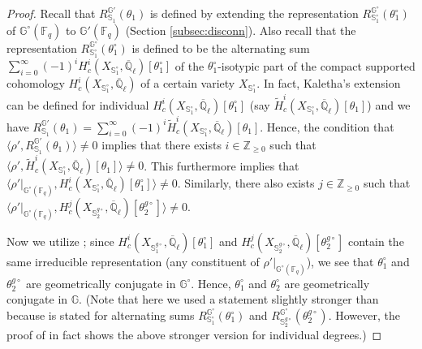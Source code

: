 \documentclass{amsart}
\newcommand{\Z}{\mathbb{Z}}
\newcommand{\F}{\mathbb{F}}
\newcommand{\Q}{\mathbb{Q}}
\newcommand{\bbS}{\mathbb{S}}
\newcommand{\bbG}{\mathbb{G}}
\theoremstyle{plain}
\theoremstyle{definition}
\theoremstyle{remark}
\theoremstyle{theorem}
\begin{document}
\begin{proof}
Recall that $R_{\bbS_{1}}^{\bbG'}(\theta_{1})$ is defined by extending the representation $R_{\bbS_{1}^{\circ}}^{\bbG^{\circ}}(\theta_{1}^{\circ})$ of $\bbG^{\circ}(\F_{q})$ to $\bbG'(\F_{q})$ (Section \ref{subsec:disconn}).
Also recall that the representation $R_{\bbS_{1}^{\circ}}^{\bbG^{\circ}}(\theta_{1}^{\circ})$ is defined to be the alternating sum $\sum_{i=0}^{\infty}(-1)^{i}H_{c}^{i}(X_{\bbS_{1}^{\circ}},\overline{\Q}_{\ell})[\theta_{1}^{\circ}]$ of the $\theta_{1}^{\circ}$-isotypic part of the compact supported cohomology $H_{c}^{i}(X_{\bbS_{1}^{\circ}},\overline{\Q}_{\ell})$ of a certain variety $X_{\bbS_{1}^{\circ}}$.
In fact, Kaletha's extension can be defined for individual $H_{c}^{i}(X_{\bbS_{1}^{\circ}},\overline{\Q}_{\ell})[\theta_{1}^{\circ}]$ (say $\tilde{H}_{c}^{i}(X_{\bbS_{1}^{\circ}},\overline{\Q}_{\ell})[\theta_{1}]$) and we have $R_{\bbS_{1}}^{\bbG'}(\theta_{1})=\sum_{i=0}^{\infty}(-1)^{i}\tilde{H}_{c}^{i}(X_{\bbS_{1}^{\circ}},\overline{\Q}_{\ell})[\theta_{1}]$.
Hence, the condition that $\langle \rho', R_{\bbS_{1}}^{\bbG'}(\theta_{1}) \rangle \neq 0$ implies that there exists $i\in\Z_{\geq0}$ such that
$\langle \rho', \tilde{H}_{c}^{i}(X_{\bbS_{1}^{\circ}},\overline{\Q}_{\ell})[\theta_{1}] \rangle \neq 0$.
This furthermore implies that $\langle \rho'|_{\bbG^{\circ}(\F_{q})}, H_{c}^{i}(X_{\bbS_{1}^{\circ}},\overline{\Q}_{\ell})[\theta_{1}^{\circ}] \rangle \neq 0$.
Similarly, there also exists $j\in\Z_{\geq0}$ such that $\langle \rho'|_{\bbG^{\circ}(\F_{q})}, H_{c}^{j}(X_{\bbS_{2}^{g\circ}},\overline{\Q}_{\ell})[\theta_{2}^{g\circ}] \rangle \neq 0$.

Now we utilize \cite[Corollary 6.3]{DL76}; since $H_{c}^{i}(X_{\bbS_{1}^{g\circ}},\overline{\Q}_{\ell})[\theta_{1}^{\circ}]$ and $H_{c}^{j}(X_{\bbS_{2}^{g\circ}},\overline{\Q}_{\ell})[\theta_{2}^{g\circ}]$ contain the same irreducible representation (any constituent of $\rho'|_{\bbG^{\circ}(\F_{q})}$), we see that $\theta_{1}^{\circ}$ and $\theta_{2}^{g\circ}$ are geometrically conjugate in $\bbG^{\circ}$.
Hence, $\theta_{1}^{\circ}$ and $\theta_{2}^{\circ}$ are geometrically conjugate in $\bbG$.
(Note that here we used a statement slightly stronger than \cite[Corollary 6.3]{DL76} because \cite[Corollary 6.3]{DL76} is stated for alternating sums $R_{\bbS_{1}^{\circ}}^{\bbG^{\circ}}(\theta_{1}^{\circ})$ and $R_{\bbS_{2}^{g\circ}}^{\bbG^{\circ}}(\theta_{2}^{g\circ})$.
However, the proof of \cite[Theorem 6.2]{DL76} in fact shows the above stronger version for individual degrees.)
\end{proof}
\end{document}
